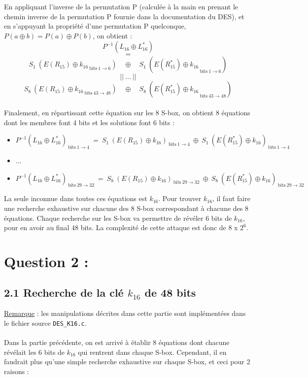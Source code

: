		\noindent En appliquant l'inverse de la permutation P (calculée à la main en prenant le chemin inverse de la permutation P fournie dans la documentation du DES), et en s'appuyant la propriété d'une permutation P quelconque, $P(a \oplus b) = P(a) \oplus P(b)$, on obtient :
		\[P^{-1}(L_{16} \oplus L_{16}^{*})\]
		\[=\] 
		\[ S_{1}\ ({E(R_{15}) \oplus k_{16}}_{\ \textrm{bits}\ 1 \to 6})\quad \oplus \quad S_{1}\ ({E(R_{15}^{*}) \oplus k_{16}}_{\ \textrm{bits}\ 1 \to 6}) \]
		\[||\ ...\ ||\]
		\[ S_{8}\ ({E(R_{15}) \oplus k_{16}}_{\ \textrm{bits}\ 43 \to 48})\quad \oplus \quad S_{8}\ ({E(R_{15}^{*}) \oplus k_{16}}_{\ \textrm{bits}\ 43 \to 48}) \]
		\\
		\noindent Finalement, en répartissant cette équation sur les 8 S-box, on obtient 8 équations dont les membres font 4 bits et les solutions font 6 bits :
		\begin{itemize}
			\item $P^{-1}(L_{16} \oplus L_{16}^{*})_{\ \textrm{bits}\ 1 \to 4}\ = \ S_{1}\ (E(R_{15}) \oplus k_{16})_{\ \textrm{bits}\ 1 \to 4}\ \oplus \ S_{1}\ (E(R_{15}^{*}) \oplus k_{16})_{\ \textrm{bits}\ 1 \to 4}$
			\item ...
			\item $P^{-1}(L_{16} \oplus L_{16}^{*})_{\ \textrm{bits}\ 29 \to 32}\ = \ S_{8}\ (E(R_{15}) \oplus k_{16})_{\ \textrm{bits}\ 29 \to 32}\ \oplus \ S_{8}\ (E(R_{15}^{*}) \oplus k_{16})_{\ \textrm{bits}\ 29 \to 32}$
		\end{itemize}
		
		La seule inconnue dans toutes ces équations est $k_{16}$. Pour trouver $k_{16}$, il faut faire une recherche exhaustive sur chacune des 8 S-box correspondant à chacune des 8 équations. Chaque recherche sur les S-box va permettre de révéler 6 bits de $k_{16}$, pour en avoir au final 48 bits. La complexité de cette attaque est donc de $8$ x $2^{6}$.
		
	\section*{Question 2 :}
		\subsection*{2.1 Recherche de la clé $k_{16}$ de 48 bits}
		\noindent \underline{Remarque} : les manipulations décrites dans cette partie sont implémentées dans le fichier source \lstinline!DES_K16.c!.
		
		\paragraph{} Dans la partie précédente, on est arrivé à établir 8 équations dont chacune révélait les 6 bits de $k_{16}$ qui rentrent dans chaque S-box. Cependant, il en faudrait plus qu'une simple recherche exhaustive sur chaque S-box, et ceci pour 2 raisons :
		
